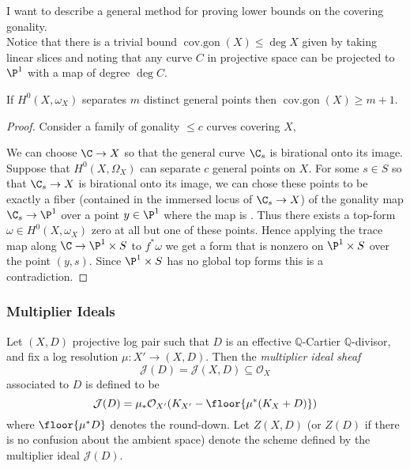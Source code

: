 \documentclass[12pt]{article}
\theoremstyle{plain}
\newcommand{\mb}[1]{\mathbb{#1}}
\DeclareMathOperator{\cg}{cov.gon}
\DeclareMathOperator{\covgon}{cov.gon}
\begin{document}
I want to describe a general method for proving lower bounds on the covering gonality. 
\bigskip\\
Notice that there is a trivial bound $\covgon(X) \le \deg{X}$ given by taking linear slices and noting that any curve  $C$ in projective space can be projected to $\P^1$ with a map of degree $\deg{C}$. 


\begin{prop}
If $H^0(X, \omega_X)$ separates $m$ distinct general points then $\cg(X) \ge m + 1$.
\end{prop}

\begin{proof}
Consider a family of gonality $\le c$ curves covering $X$,
\begin{center}
\end{center}
We can choose $\C \to X$ so that the general curve $\C_s$ is birational onto its image. 
Suppose that $H^0(X, \Omega_X)$ can separate $c$ general points on $X$. For some $s \in S$ so that $\C_s \to X$ is birational onto its image, we can chose these points to be exactly a fiber (contained in the immersed locus of $\C_s \to X$) of the gonality map $\C_s \to \P^1$ over a point $y \in \P^1$ where the map is \etale. Thus there exists a top-form $\omega \in H^0(X, \omega_X)$ zero at all but one of these points. Hence applying the trace map along $\C \to \P^1 \times S$ to $f^* \omega$ we get a form that is nonzero on $\P^1 \times S$ over the point $(y, s)$. Since $\P^1 \times S$ has no global top forms this is a contradiction.
\end{proof}

\subsubsection{Multiplier Ideals}

\newcommand{\mtc}[1]{\mathcal{#1}}

\begin{defn}\textup{
    Let $(X,D)$ projective log pair such that $D$ is an effective $\mb{Q}$-Cartier $\mb{Q}$-divisor, and fix a log resolution $\mu : X' \rightarrow (X,D)$. Then the \emph{multiplier ideal sheaf}
    \[ \mtc{J}(D) = \mtc{J}(X,D)\subseteq \mtc{O}_X \]
    associated to $D$ is defined to be
    \[ \mtc{J}(D)=\mu_{*}\mtc{O}_{X'}(K_{X'}-\floor{\mu^{*}(K_X + D)}) \]
    where $\floor{\mu^{\ast}D}$ denotes the round-down. Let $Z(X,D)$ (or $Z(D)$ if there is no confusion about the ambient space) denote the scheme defined by the multiplier ideal $\mtc{J}(D)$.
}
\end{defn}
\end{document}
